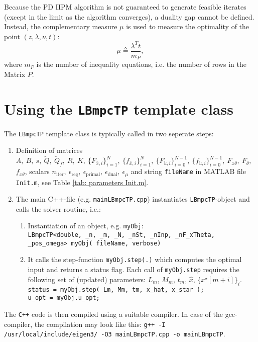 \documentclass[letter]{article}
\begin{document}
\begin{sffamily}
\noindent
Because the PD IIPM algorithm is not guaranteed to generate feasible iterates (except in the limit as the algorithm converges), a duality gap cannot be defined. Instead, the complementary measure $\mu$ is used to measure the optimality of the point $(z,\lambda,\nu,t)$:
\begin{equation}
\label{eq: dualityGap}
	\mu\triangleq \frac{\lambda^T t}{m_P},
\end{equation}
where $m_P$ is the number of inequality equations, i.e. the number of rows in the Matrix $P$.

\section{Using the \texttt{LBmpcTP} template class}
The \texttt{LBmpcTP} template class is typically called in two seperate steps:

\begin{enumerate}
	\item Definition of matrices $A,\ B,\ s,\ \tilde{Q},\ \tilde{Q}_f,\ R,\ K,\ \{F_{\bar{x},i}\}_{i=1}^N,\ \{f_{\bar{x},i}\}_{i=1}^N,\ \{F_{\check{u},i}\}_{i=0}^{N-1},\ \{f_{\check{u},i}\}_{i=0}^{N-1},\ F_{x\theta},\ F_\theta,$ $f_{x\theta}$, scalars $n_\text{iter},\ \epsilon_\text{reg},\ \epsilon_\text{primal},\ \epsilon_\text{dual},\ \epsilon_\mu$ and string \texttt{fileName} in MATLAB file \texttt{Init.m}, see Table \ref{tab: parameters Init.m}.
	\item The main C++-file (e.g. \texttt{mainLBmpcTP.cpp}) instantiates \texttt{LBmpcTP}-object and calls the solver routine, i.e.:
	\begin{enumerate}
		\item Instantiation of an object, e.g. \texttt{myObj}: \\
		\texttt{LBmpcTP<double, \_n, \_m, \_N, \_nSt, \_nInp, \_nF\_xTheta, \_pos\_omega> myObj( fileName, verbose)}
		\item It calls the step-function \texttt{myObj.step(.)} which computes the optimal input and returns a status flag. Each call of \texttt{myObj.step} requires the following set of (updated) parameters: $L_m$, $M_m$, $t_m$, $\hat{x}$, $\{x^\star[m+i]\}_i$. \\
		\texttt{status = myObj.step( Lm, Mm, tm, x\_hat, x\_star );}\\
		\texttt{u\_opt = myObj.u\_opt;}
	\end{enumerate}
\end{enumerate}

\noindent
The \texttt{C++} code is then compiled using a suitable compiler. In case of the gcc-compiler, the compilation may look like this: \newline
\texttt{g++ -I /usr/local/include/eigen3/ -O3 mainLBmpcTP.cpp -o mainLBmpcTP}. \\



\end{sffamily}
\end{document}
